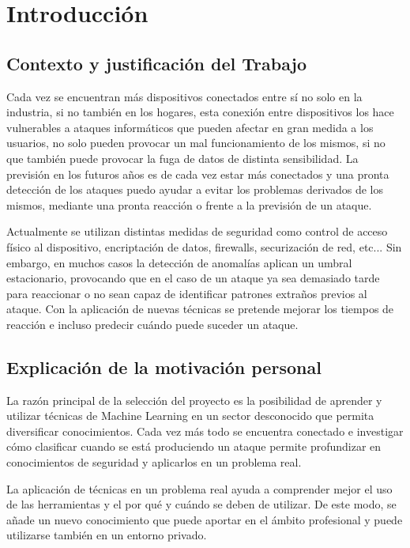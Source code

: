 \chapter{Introducción}
\label{chapter:introduccion}


\section{Contexto y justificación del Trabajo}
Cada vez se encuentran más dispositivos conectados entre sí no solo en la industria, si no también en los hogares, esta conexión entre dispositivos los hace vulnerables a ataques informáticos que pueden afectar en gran medida a los usuarios, no solo pueden provocar un mal funcionamiento de los mismos, si no que también puede provocar la fuga de datos de distinta sensibilidad. La previsión en los futuros años es de cada vez estar más conectados y una pronta detección de los ataques puedo ayudar a evitar los problemas derivados de los mismos, mediante una pronta reacción o frente a la previsión de un ataque.

\vspace{0.5cm}

Actualmente se utilizan distintas medidas de seguridad como control de acceso físico al dispositivo, encriptación de datos, firewalls, securización de red, etc... Sin embargo, en muchos casos la detección de anomalías aplican un umbral estacionario, provocando que en el caso de un ataque ya sea demasiado tarde para reaccionar o no sean capaz de identificar patrones extraños previos al ataque. Con la aplicación de nuevas técnicas se pretende mejorar los tiempos de reacción e incluso predecir cuándo puede suceder un ataque.

\section{Explicación de la motivación personal}
La razón principal de la selección del proyecto es la posibilidad de aprender y utilizar técnicas de Machine Learning en un sector desconocido que permita diversificar conocimientos. Cada vez más todo se encuentra conectado e investigar cómo clasificar cuando se está produciendo un ataque permite profundizar en conocimientos de seguridad y aplicarlos en un problema real.

\vspace{0.5cm}

La aplicación de técnicas en un problema real ayuda a comprender mejor el uso de las herramientas y el por qué y cuándo se deben de utilizar. De este modo, se añade un nuevo conocimiento que puede aportar en el ámbito profesional y puede utilizarse también en un entorno privado.


